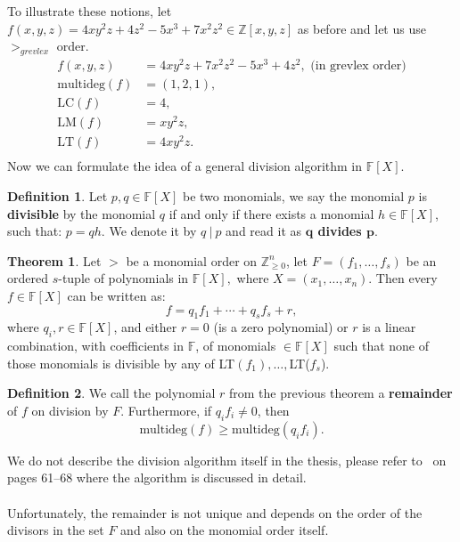 \documentclass[thesis=M,english]{FITthesis}[2012/10/20]
\theoremstyle{remark}
\theoremstyle{definition}
\newtheorem{DF}{Definition}[section]
\newtheorem{theorem}{Theorem}[section]
\begin{document}
\noindent To illustrate these notions, let $f(x,y,z) = 4xy^2z + 4z^2 - 5x^3 + 7x^2z^2 \in \mathbb{Z}[x,y,z]$ as before and let us use $>_{grevlex}$ order.
\begin{align*}
f(x,y,z) &= 4xy^2z + 7x^2z^2  -5x^3 + 4z^2, \text{ (in  grevlex order)}\\
\text{multideg}(f)&=(1,2,1), \\
\text{LC}(f)&=4, \\
\text{LM}(f)&=xy^2z, \\
\text{LT}(f)&=4xy^2z. \\
\end{align*}
Now we can formulate the idea of a general division algorithm in $\mathbb{F}[X]$.
\begin{DF}
Let $p, q \in \mathbb{F}[X]$ be two monomials, we say the monomial $p$ is \textbf{divisible} by the monomial $q$ if and only if there exists a monomial $h \in \mathbb{F}[X]$, such that: $p = qh$. We denote it by $q\ |\ p$ and read it as \textbf{$\mathbf{q}$ divides $\mathbf{p}$}.
\end{DF}
\begin{theorem}
Let $>$ be a monomial order on $\mathbb{Z}_{\geq 0}^n$, let $F = (f_1, \ldots, f_s)$ be an ordered $s$-tuple of polynomials in $\mathbb{F}[X],$ where $X = (x_1, \ldots, x_n)$. Then every $f \in \mathbb{F}[X]$ can be written as:
$$
f = q_1f_1 + \cdots + q_sf_s + r,
$$
where $q_i, r \in \mathbb{F}[X]$, and either $r = 0$ (is a zero polynomial) or $r$ is a linear combination, with coefficients in $\mathbb{F}$, of monomials $\in \mathbb{F}[X]$ such that none of those monomials is divisible by any of LT$(f_1), \ldots,$LT($f_s$).
\end{theorem}
\begin{DF}
We call the polynomial $r$ from the previous theorem a \textbf{remainder} of $f$ on division by $F$. Furthermore, if $q_if_i \neq 0$, then
$$
\text{multideg}(f) \geq \text{multideg}(q_if_i).
$$
\end{DF}
\noindent We do not describe the division algorithm itself in the thesis, please refer to~\cite{algGeom} on pages 61--68 where the algorithm is discussed in detail.\\ \\
\noindent Unfortunately, the remainder is not unique and depends on the order of the divisors in the set $F$ and also on the monomial order itself. \\ \\
\end{document}
